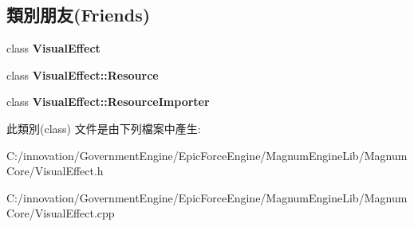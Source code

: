 \subsection*{類別朋友(Friends)}
\begin{DoxyCompactItemize}
\item 
class {\bfseries Visual\+Effect}\hypertarget{class_i_dream_sky_1_1_visual_effect_1_1_data_ad19546ee8a8868c73e6f88564fb88462}{}\label{class_i_dream_sky_1_1_visual_effect_1_1_data_ad19546ee8a8868c73e6f88564fb88462}

\item 
class {\bfseries Visual\+Effect\+::\+Resource}\hypertarget{class_i_dream_sky_1_1_visual_effect_1_1_data_a7e5f0c0359cb7300a876070f845cb939}{}\label{class_i_dream_sky_1_1_visual_effect_1_1_data_a7e5f0c0359cb7300a876070f845cb939}

\item 
class {\bfseries Visual\+Effect\+::\+Resource\+Importer}\hypertarget{class_i_dream_sky_1_1_visual_effect_1_1_data_a316a2d14e00fb787148dd7c1f760c78c}{}\label{class_i_dream_sky_1_1_visual_effect_1_1_data_a316a2d14e00fb787148dd7c1f760c78c}

\end{DoxyCompactItemize}


此類別(class) 文件是由下列檔案中產生\+:\begin{DoxyCompactItemize}
\item 
C\+:/innovation/\+Government\+Engine/\+Epic\+Force\+Engine/\+Magnum\+Engine\+Lib/\+Magnum\+Core/Visual\+Effect.\+h\item 
C\+:/innovation/\+Government\+Engine/\+Epic\+Force\+Engine/\+Magnum\+Engine\+Lib/\+Magnum\+Core/Visual\+Effect.\+cpp\end{DoxyCompactItemize}
